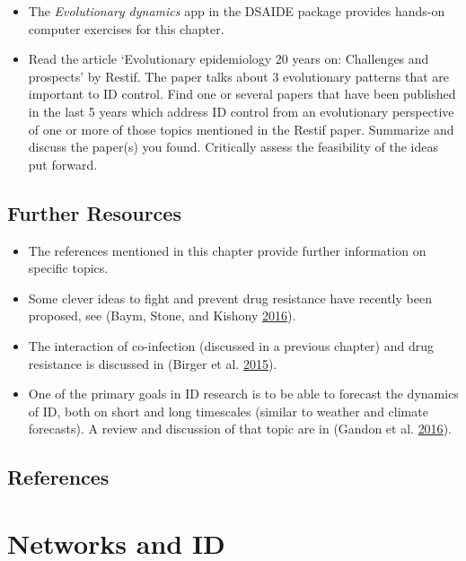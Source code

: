 \documentclass[]{article}
\providecommand{\tightlist}{%
  \setlength{\itemsep}{0pt}\setlength{\parskip}{0pt}}
\theoremstyle{definition}
\theoremstyle{definition}
\theoremstyle{definition}
\theoremstyle{remark}
\begin{document}
\begin{itemize}
\tightlist
\item
  The \emph{Evolutionary dynamics} app in the DSAIDE package provides
  hands-on computer exercises for this chapter.
\item
  Read the article `Evolutionary epidemiology 20 years on: Challenges
  and prospects' by Restif. The paper talks about 3 evolutionary
  patterns that are important to ID control. Find one or several papers
  that have been published in the last 5 years which address ID control
  from an evolutionary perspective of one or more of those topics
  mentioned in the Restif paper. Summarize and discuss the paper(s) you
  found. Critically assess the feasibility of the ideas put forward.
\end{itemize}

\subsection{Further Resources}\label{further-resources-12}

\begin{itemize}
\tightlist
\item
  The references mentioned in this chapter provide further information
  on specific topics.
\item
  Some clever ideas to fight and prevent drug resistance have recently
  been proposed, see (Baym, Stone, and Kishony
  \protect\hyperlink{ref-baym16}{2016}).
\item
  The interaction of co-infection (discussed in a previous chapter) and
  drug resistance is discussed in (Birger et al.
  \protect\hyperlink{ref-birger15}{2015}).
\item
  One of the primary goals in ID research is to be able to forecast the
  dynamics of ID, both on short and long timescales (similar to weather
  and climate forecasts). A review and discussion of that topic are in
  (Gandon et al. \protect\hyperlink{ref-gandon16}{2016}).
\end{itemize}

\subsection{References}\label{references-13}

\section{Networks and ID}\label{networks-and-id}
\end{document}
